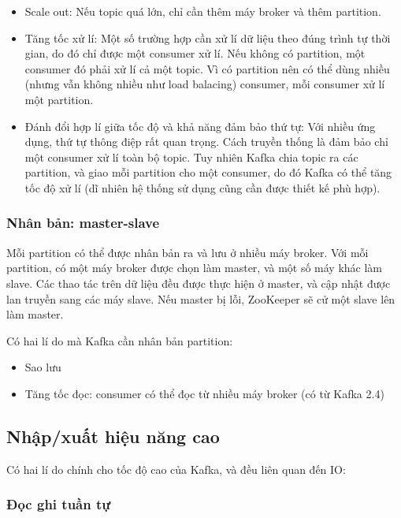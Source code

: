 \documentclass{article}
\begin{document}
\begin{itemize}
    \item Scale out: Nếu topic quá lớn, chỉ cần thêm máy broker và thêm
    partition.
    \item Tăng tốc xử lí: Một số trường hợp cần xử lí dữ liệu theo đúng trình tự
    thời gian, do đó chỉ được một consumer xử lí. Nếu không có partition, một
    consumer đó phải xử lí cả một topic. Vì có partition nên có thể dùng nhiều
    (nhưng vẫn không nhiều như load balacing) consumer, mỗi consumer xử lí một
    partition.
    \item Đánh đổi hợp lí giữa tốc độ và khả năng đảm bảo thứ tự: Với nhiều ứng
    dụng, thứ tự thông điệp rất quan trọng. Cách truyền thống là đảm bảo chỉ một
    consumer xử lí toàn bộ topic. Tuy nhiên Kafka chia topic ra các partition,
    và giao mỗi partition cho một consumer, do đó Kafka có thể tăng tốc độ xử lí
    (dĩ nhiên hệ thống sử dụng cũng cần được thiết kế phù hợp).
\end{itemize}

\subsubsection{Nhân bản: master-slave}

Mỗi partition có thể được nhân bản ra và lưu ở nhiều máy broker. Với mỗi
partition, có một máy broker được chọn làm master, và một số máy khác làm slave.
Các thao tác trên dữ liệu đều được thực hiện ở master, và cập nhật được lan
truyền sang các máy slave. Nếu master bị lỗi, ZooKeeper sẽ cử một slave lên làm
master.

Có hai lí do mà Kafka cần nhân bản partition:

\begin{itemize}
    \item Sao lưu
    \item Tăng tốc đọc: consumer có thể đọc từ nhiều máy broker (có từ Kafka
    2.4)
\end{itemize}

\subsection{Nhập/xuất hiệu năng cao}

Có hai lí do chính cho tốc độ cao của Kafka, và đều liên quan đến IO:

\subsubsection{Đọc ghi tuần tự}
\end{document}
